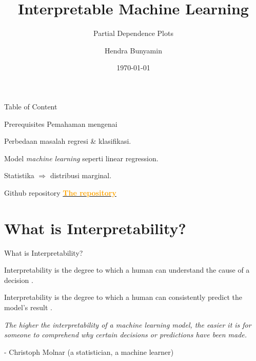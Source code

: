 \documentclass[aspectratio=169]{beamer}
\title[Interpretability]{Interpretable Machine Learning}
\author{Hendra Bunyamin}
\subtitle[PDPs]{Partial Dependence Plots}
\institute{Maranatha Christian University}
\date{\today}
\begin{document}
\maketitle


\begin{frame}{Table of Content}
    \tableofcontents
\end{frame}

\begin{frame}{Prerequisites}
	Pemahaman mengenai
	\begin{vfilleditems}
		\item Perbedaan masalah regresi \& klasifikasi.
		\item Model \textit{machine learning} seperti linear regression.
		\item Statistika $\Rightarrow$ distribusi marginal.
	\end{vfilleditems}
\end{frame}

\begin{frame}{Github repository}
	\href{https://github.com/hbunyamin/2021-nuni-it-online-seminar}{\textcolor{orange}{\textbf{The repository}} }
\end{frame}

\section{What is Interpretability?}
\begin{frame}{What is Interpretability? }
    \begin{vfilleditems}
	\item Interpretability is the degree to which a human can understand the cause of a decision  \citep{miller2019explanation}.
	\item Interpretability is the degree to which a human can consistently predict the model's result \citep{kim2016examples}.
	\end{vfilleditems}
\end{frame}

\begin{frame}
	\centering
	\textit{The higher the interpretability of a machine learning model, the easier it is for someone to comprehend why certain decisions or predictions have been made.}
	
	\bigskip
	- Christoph Molnar (a statistician, a machine learner)
\end{frame}
\end{document}
